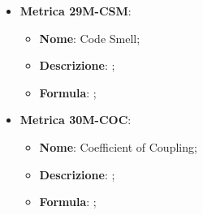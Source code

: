 \begin{itemize}
    \item \textbf{Metrica 29M-CSM}:
    \begin{itemize}
        \item \textbf{Nome}: Code Smell;
        \item \textbf{Descrizione}: ;
        \item \textbf{Formula}: ;
    \end{itemize}
\end{itemize}

\begin{itemize}
    \item \textbf{Metrica 30M-COC}:
    \begin{itemize}
        \item \textbf{Nome}: Coefficient of Coupling;
        \item \textbf{Descrizione}: ;
        \item \textbf{Formula}: ;
    \end{itemize}
\end{itemize}